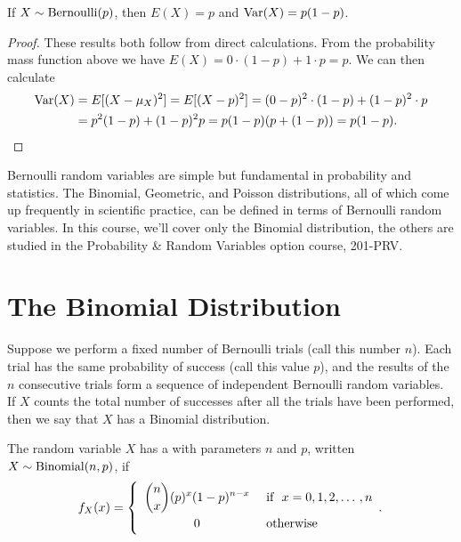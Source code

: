 \begin{proposition}\label{BernoulliExpectation} If $X \sim \operatorname{Bernoulli}(p)$, then $E(X) = p$ and $\operatorname{Var}(X) = p(1-p)$.
\end{proposition}

\begin{proof} These results both follow from direct calculations. From the probability mass function above we have $E(X) = 0 \cdot (1-p) + 1 \cdot p  = p$. We can then calculate
$$\begin{aligned}\operatorname{Var}(X) &= E[(X - \mu_X)^2] = E[(X - p)^2] = (0-p)^2 \cdot (1-p) + (1-p)^2 \cdot p \\
&= p^2(1-p) + (1-p)^2p = p(1-p)(p+(1-p)) = p(1-p).\end{aligned}$$
\end{proof}

Bernoulli random variables are simple but fundamental in probability and statistics. The Binomial, Geometric, and Poisson distributions, all of which come up frequently in scientific practice, can be defined in terms of Bernoulli random variables. In this course, we'll cover only the Binomial distribution, the others are studied in the Probability \& Random Variables option course, 201-PRV.

\section{The Binomial Distribution}\label{BinomialSec}

Suppose we perform a fixed number of Bernoulli trials (call this number $n$). Each trial has the same probability of success (call this value $p$), and the results of the $n$ consecutive trials form a sequence of independent Bernoulli random variables. If $X$ counts the total number of successes after all the trials have been performed, then we say that $X$ has a Binomial distribution.

\begin{definition} The random variable $X$ has a  with parameters $n$ and $p$, written $X \sim \operatorname{Binomial}(n,p)$, if
$$f_X(x) = \left\{
\renewcommand*{\arraystretch}{1.35}
\begin{array}{cl}
      \displaystyle\binom{n}{x}(p)^x(1-p)^{n-x} & \text{ if \ } x = 0, 1, 2, \dots \, , n \\
      0 & \text{ otherwise } \\ \end{array}.
      \renewcommand*{\arraystretch}{1}
\right.$$
\end{definition}


